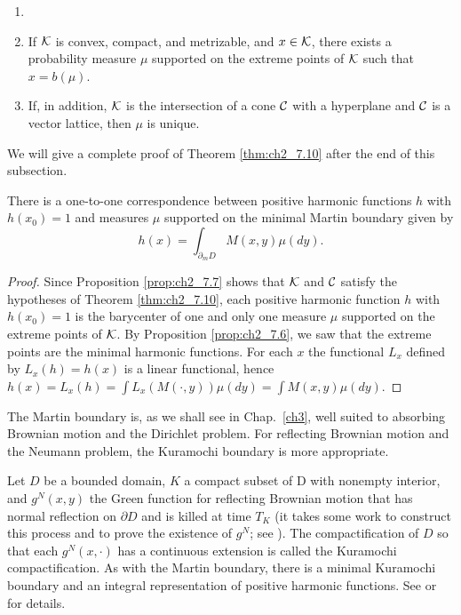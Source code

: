 \begin{theorem}[Choquet]\label{thm:ch2_7.10}
\begin{enumerate}
    \item[]
    \item If $\mathcal{K}$ is convex, compact, and metrizable, and $x \in \mathcal{K}$, there exists a probability measure $\mu$ supported on the extreme points of $\mathcal{K}$ such that $x = b(\mu)$.
    \item If, in addition, $\mathcal{K}$ is the intersection of a cone $\mathcal{C}$ with a hyperplane and $\mathcal{C}$ is a vector lattice, then $\mu$ is unique.
\end{enumerate}
\end{theorem}

\mpagebreak

We will give a complete proof of Theorem \ref{thm:ch2_7.10} after the end of this subsection.


\begin{theorem}\label{thm:ch2_7.11}
There is a one-to-one correspondence between positive harmonic functions $h$ with $h(x_0) = 1$ and measures $\mu$ supported on the minimal Martin boundary given by
\[
    h(x) = \int_{\partial_m D} M(x,y)\mu(dy).
\]
\end{theorem}

\begin{proof}
Since Proposition \ref{prop:ch2_7.7} shows that $\mathcal{K}$ and $\mathcal{C}$ satisfy the hypotheses of Theorem \ref{thm:ch2_7.10}, each positive harmonic function $h$ with $h(x_0) = 1$ is the barycenter of one and only one measure $\mu$ supported on the extreme points of $\mathcal{K}$. By Proposition \ref{prop:ch2_7.6}, we saw that the extreme points are the minimal harmonic functions. For each $x$ the functional $L_x$ defined by $L_x(h) = h(x)$ is a linear functional, hence $h(x) = L_x(h) = \int L_x(M(\cdot,y))\mu(dy) = \int M(x,y)\mu(dy)$.
\end{proof}

The Martin boundary is, as we shall see in Chap.\ \ref{ch3}, well suited to absorbing Brownian motion and the Dirichlet problem. For reflecting Brownian motion and the Neumann problem, the Kuramochi boundary is more appropriate.

Let $D$ be a bounded domain, $K$ a compact subset of D with nonempty interior, and $g^N(x,y)$ the Green function for reflecting Brownian motion that has normal reflection on $\partial D$ and is killed at time $T_K$ (it takes some work to construct this process and to prove the existence of $g^N$; see \cite{Fukushima1980}). The compactification of $D$ so that each $g^N(x, \cdot)$ has a  continuous extension is called the Kuramochi compactification. As with the Martin boundary, there is a minimal Kuramochi boundary and an  integral representation of positive harmonic functions. See \cite{BassHsu1991} or \cite{Ohtsuka1964} for details.

